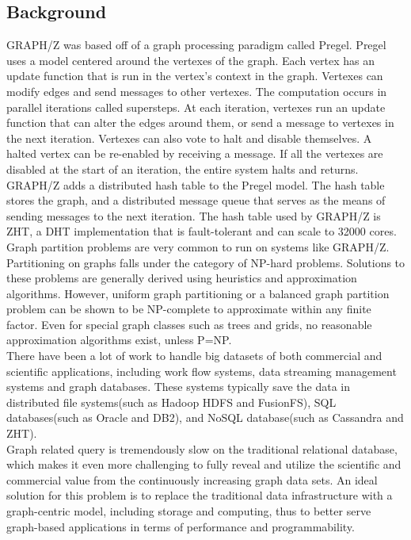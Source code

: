 \documentclass[10pt]{article}
\begin{document}
\begin{multicols}{2} 
  \section{Background}
  GRAPH/Z was based off of a graph processing paradigm called Pregel. Pregel uses a model centered around the vertexes of the graph.\cite{Gz:1}  Each vertex has an update function that is run in the vertex's context in the graph. Vertexes can modify edges and send messages to other vertexes.\cite{Gz:1} The computation occurs in parallel iterations called supersteps.\cite{Gz:1} At each iteration, vertexes run an update function that can alter the edges around them, or send a message to vertexes in the next iteration. Vertexes can also vote to halt and disable themselves. A halted vertex can be re-enabled by receiving a message. If all the vertexes are disabled at the start of an iteration, the entire system halts and returns.\\
  GRAPH/Z adds a distributed hash table to the Pregel model. The hash table stores the graph, and a distributed message queue that serves as the means of sending messages to the next iteration. The hash table used by GRAPH/Z is ZHT, a DHT implementation that is fault-tolerant and can scale to 32000 cores.\cite{Gz:2}\\
  Graph partition problems are very common to run on systems like GRAPH/Z. Partitioning on graphs falls under the category of NP-hard problems. Solutions to these problems are generally derived using heuristics and approximation algorithms. However, uniform graph partitioning or a balanced graph partition problem can be shown to be NP-complete to approximate within any finite factor. Even for special graph classes such as trees and grids, no reasonable approximation algorithms exist, unless P=NP.\\
  There have been a lot of work to handle big datasets of both commercial and scientific applications, including work flow systems, data streaming management systems and graph databases. These systems typically save the data in distributed file systems(such as Hadoop HDFS and FusionFS), SQL databases(such as Oracle and DB2), and NoSQL database(such as Cassandra and ZHT).\\
  Graph related query is tremendously slow on the traditional relational database, which makes it even more challenging to fully reveal and utilize the scientific and commercial value from the continuously increasing graph data sets. An ideal solution for this problem is to replace the traditional data infrastructure with a graph-centric model, including storage and computing, thus to better serve graph-based applications in terms of performance and programmability.\\

\end{multicols}
\end{document}
